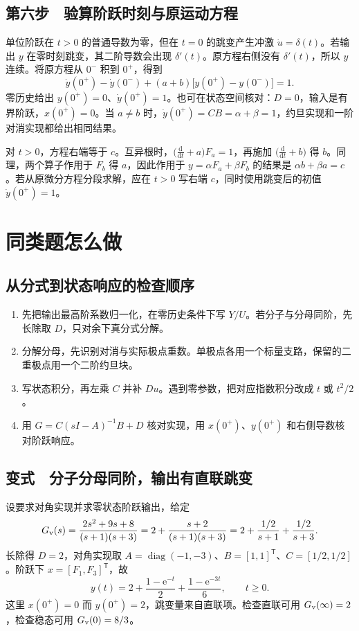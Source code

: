 \subsection{第六步　验算阶跃时刻与原运动方程}

单位阶跃在 $t>0$ 的普通导数为零，但在 $t=0$ 的跳变产生冲激 $\dot u=\delta(t)$。若输出 $y$ 在零时刻跳变，其二阶导数会出现 $\delta'(t)$。原方程右侧没有 $\delta'(t)$，所以 $y$ 连续。将原方程从 $0^-$ 积到 $0^+$，得到
\[
 \dot y(0^+)-\dot y(0^-)
 +(a+b)\bigl[y(0^+)-y(0^-)\bigr]=1.
\]
零历史给出 $y(0^+)=0$、$\dot y(0^+)=1$。也可在状态空间核对：$D=0$，输入是有界阶跃，$x(0^+)=0$。当 $a\ne b$ 时，$\dot y(0^+)=CB=\alpha+\beta=1$，约旦实现和一阶对消实现都给出相同结果。

对 $t>0$，方程右端等于 $c$。互异根时，$\bigl(\frac{\mathrm d}{\mathrm dt}+a\bigr)F_a=1$，再施加 $\bigl(\frac{\mathrm d}{\mathrm dt}+b\bigr)$ 得 $b$。同理，两个算子作用于 $F_b$ 得 $a$，因此作用于 $y=\alpha F_a+\beta F_b$ 的结果是 $\alpha b+\beta a=c$。若从原微分方程分段求解，应在 $t>0$ 写右端 $c$，同时使用跳变后的初值 $\dot y(0^+)=1$。

\section{同类题怎么做}

\subsection{从分式到状态响应的检查顺序}

\begin{enumerate}
 \item 先把输出最高阶系数归一化，在零历史条件下写 $Y/U$。若分子与分母同阶，先长除取 $D$，只对余下真分式分解。
 \item 分解分母，先识别对消与实际极点重数。单极点各用一个标量支路，保留的二重极点用一个二阶约旦块。
 \item 写状态积分，再左乘 $C$ 并补 $Du$。遇到零参数，把对应指数积分改成 $t$ 或 $t^2/2$。
 \item 用 $G=C(sI-A)^{-1}B+D$ 核对实现，用 $x(0^+)$、$y(0^+)$ 和右侧导数核对阶跃响应。
\end{enumerate}

\subsection{变式　分子分母同阶，输出有直联跳变}

设要求对角实现并求零状态阶跃输出，给定
\[
 G_{\rm v}(s)=\frac{2s^2+9s+8}{(s+1)(s+3)}
 =2+\frac{s+2}{(s+1)(s+3)}
 =2+\frac{1/2}{s+1}+\frac{1/2}{s+3}.
\]
长除得 $D=2$，对角实现取 $A=\operatorname{diag}(-1,-3)$、$B=[1,1]^{\mathsf T}$、$C=[1/2,1/2]$。阶跃下 $x=[F_1,F_3]^{\mathsf T}$，故
\[
 y(t)=2+\frac{1-\mathrm e^{-t}}{2}+\frac{1-\mathrm e^{-3t}}{6},
 \qquad t\ge0.
\]
这里 $x(0^+)=0$ 而 $y(0^+)=2$，跳变量来自直联项。检查直联可用 $G_{\rm v}(\infty)=2$，检查稳态可用 $G_{\rm v}(0)=8/3$。
